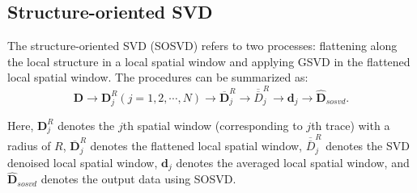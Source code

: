 \subsection{Structure-oriented SVD}
The structure-oriented SVD (SOSVD) refers to two processes: flattening along the local structure in a local  spatial window and applying GSVD in the flattened local spatial window. The procedures can be summarized as:
\begin{equation}
\label{eq:proc}
\mathbf{D} \rightarrow \mathbf{D}_j^R (j=1,2,\cdots,N) \rightarrow \overline{\mathbf{D}}_j^R \rightarrow \overline{\overline{D}}_j^R \rightarrow \mathbf{d}_j \rightarrow \hat{\mathbf{D}}_{sosvd}.
\end{equation}

Here, $\mathbf{D}_j^R$ denotes the $j$th spatial window (corresponding to $j$th trace) with a radius of $R$, $\overline{\mathbf{D}}_j^R$ denotes the flattened local spatial window, $\overline{\overline{D}}_j^R$ denotes the SVD denoised local spatial window, $\mathbf{d}_j$ denotes the averaged local spatial window, and $\hat{\mathbf{D}}_{sosvd}$ denotes the output data using SOSVD.

